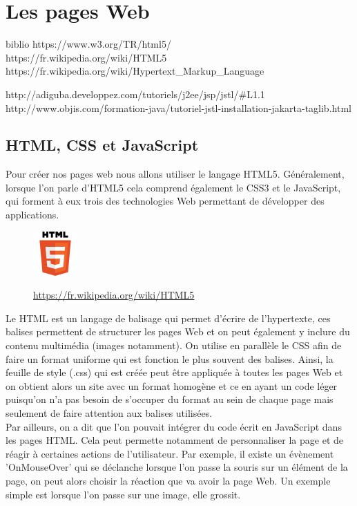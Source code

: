 \section{Les pages Web}
biblio
https://www.w3.org/TR/html5/ \\
https://fr.wikipedia.org/wiki/HTML5 \\
https://fr.wikipedia.org/wiki/Hypertext\_Markup\_Language

http://adiguba.developpez.com/tutoriels/j2ee/jsp/jstl/\#L1.1
http://www.objis.com/formation-java/tutoriel-jstl-installation-jakarta-taglib.html

\subsection{HTML, CSS et JavaScript}
Pour créer nos pages web nous allons utiliser le langage HTML5. Généralement, lorsque l'on parle d'HTML5 cela comprend également le CSS3 et le JavaScript, qui forment à eux trois des technologies Web permettant de développer des applications.
\begin{figure}[H]
  \center
  \includegraphics[scale=0.6]{../graph/html5.png} \\
  \caption{ \url{https://fr.wikipedia.org/wiki/HTML5}}
\end{figure}

Le HTML est un langage de balisage qui permet d'écrire de l'hypertexte, ces balises permettent de structurer les pages Web et on peut également y inclure du contenu multimédia (images notamment). On utilise en parallèle le CSS afin de faire un format uniforme qui est fonction le plus souvent des balises. Ainsi, la feuille de style (.css) qui est créée peut être appliquée à toutes les pages Web et on obtient alors un site avec un format homogène et ce en ayant un code léger puisqu'on n'a pas besoin de s'occuper du format au sein de chaque page mais seulement de faire attention aux balises utilisées.\\

Par ailleurs, on a dit que l'on pouvait intégrer du code écrit en JavaScript dans les pages HTML. Cela peut permette notamment de personnaliser la page et de réagir à certaines actions de l'utilisateur. Par exemple, il existe un évènement 'OnMouseOver' qui se déclanche lorsque l'on passe la souris sur un élément de la page, on peut alors choisir la réaction que va avoir la page Web. Un exemple simple est lorsque l'on passe sur une image, elle grossit. \\

